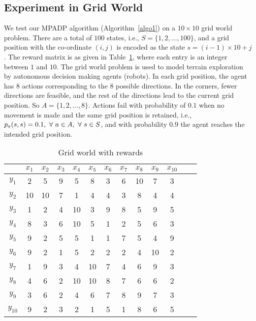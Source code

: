 \subsection{Experiment in Grid World}\label{exper}
We test our MPADP algorithm (Algorithm~\ref{algo1}) on a $10 \times 10$ grid world problem. There are a total of $100$ states, i.e., $S=\{1,2,\ldots,100\}$, and a grid position with the co-ordinate $(i,j)$ is encoded as the state $s=(i-1)\times 10+j$. The reward matrix is as given in Table~\ref{reward}, where each entry is an integer between $1$ and $10$. 
The grid world problem is used to model terrain exploration by autonomous decision making agents (robots).
In each grid position, the agent has $8$ actions corresponding to the $8$ possible directions. In the corners, fewer directions are feasible, and the rest of the directions lead to the current grid position. So $A=\{1,2,\ldots,8\}$. Actions fail with probability of $0.1$ when no movement is made and the same grid position is retained, i.e., $p_a(s,s)=0.1, \mbox{ } \forall \mbox{ } a \in A, \mbox{ } \forall \mbox{ } s \in S$, and with probability $0.9$ the agent reaches the intended grid position.
\FloatBarrier
\begin{table}[H]
\begin{tabular}{|c|c|c|c|c|c|c|c|c|c|c|c|c|}\hline
&$x_{1}$	&$x_{2}$	&$x_{3}$	&$x_{4}$	&$x_{5}$	&$x_{6}$	&$x_{7}$	&$x_{8}$	&$x_{9}$	&$x_{10}$	\\ \hline 
$y_{1}$	&2	&5	&9	&5	&8	&3	&6	&10	&7	&3	\\ \hline 
$y_{2}$	&10	&10	&7	&1	&4	&4	&3	&8	&4	&4	\\ \hline 
$y_{3}$	&1	&2	&4	&10	&3	&9	&8	&5	&9	&5	\\ \hline 
$y_{4}$	&8	&3	&6	&10	&5	&1	&2	&5	&6	&3	\\ \hline 
$y_{5}$	&9	&2	&5	&5	&1	&1	&7	&5	&4	&9	\\ \hline 
$y_{6}$	&9	&2	&1	&5	&2	&2	&2	&4	&10	&2	\\ \hline 
$y_{7}$	&1	&9	&3	&4	&10	&7	&4	&6	&9	&3	\\ \hline 
$y_{8}$	&4	&6	&2	&10	&10	&8	&7	&6	&6	&2	\\ \hline 
$y_{9}$	&3	&6	&2	&4	&6	&7	&8	&9	&7	&3	\\ \hline 
$y_{10}$	&9	&2	&3	&2	&1	&5	&1	&8	&6	&5	\\ \hline 
\end{tabular}
\caption{Grid world with rewards}
\label{reward}
\end{table}


